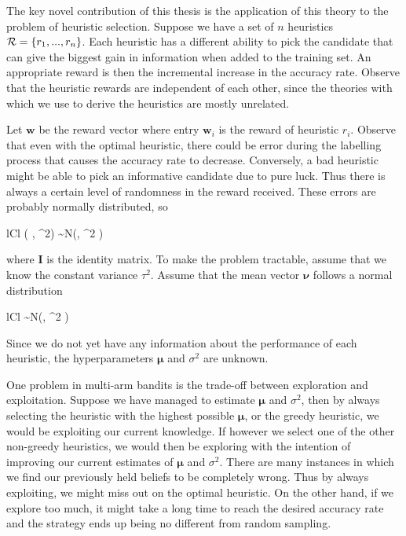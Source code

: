 The key novel contribution of this thesis is the application of this theory to the problem of
heuristic selection. Suppose we have a set of $n$ heuristics $ \mathcal{R} = \{r_1, ..., r_n \}$. Each heuristic
has a different ability to pick the candidate that can give the biggest gain in information
when added to the training set. An appropriate reward is then the incremental increase
in the accuracy rate. Observe that the heuristic rewards are independent of each other,
since the theories with which we use to derive the heuristics are mostly unrelated.

Let $\bm{w}$ be the reward vector where entry $\bm{w}_i$ is the reward of heuristic $r_i$.
Observe that even with the optimal heuristic, there could be error during the labelling
process that causes the accuracy rate to decrease. Conversely, a bad heuristic might be
able to pick an informative candidate due to pure luck. Thus there is always a certain level
of randomness in the reward received. These errors are probably normally distributed, so
	\begin{IEEEeqnarray*}{lCl}
		( \mid \bm{\nu}, \tau^2) \sim N(\bm{\nu}, \tau^2 )
	\end{IEEEeqnarray*}
where $\bm{I}$ is the identity matrix.
To make the problem tractable, assume that we know the constant variance $\tau^2$. Assume that
the mean vector $\bm{\nu}$ follows a normal distribution
	\begin{IEEEeqnarray*}{lCl}
		\bm{\nu} \sim N(\bm{\mu}, \sigma^2 )
	\end{IEEEeqnarray*}
Since we do not yet have any information about the performance of each heuristic,
the hyperparameters $\bm{\mu}$ and $\sigma^2$ are unknown.

One problem in multi-arm bandits is the trade-off between exploration and exploitation.
Suppose we have managed to estimate $\bm{\mu}$ and $\sigma^2$, then by always selecting
the heuristic with the highest possible $\bm{\mu}$, or the greedy heuristic,
we would be exploiting our current
knowledge. If however we select one of the other non-greedy heuristics, we would then be exploring
with the intention of improving our current estimates of $\bm{\mu}$ and $\sigma^2$. There are
many instances in which we find our previously held beliefs to be completely wrong. Thus
by always exploiting, we might miss out on the optimal heuristic. On the other hand,
if we explore too much, it might take a long time to reach the desired accuracy rate and
the strategy ends up being no different from random sampling. 

